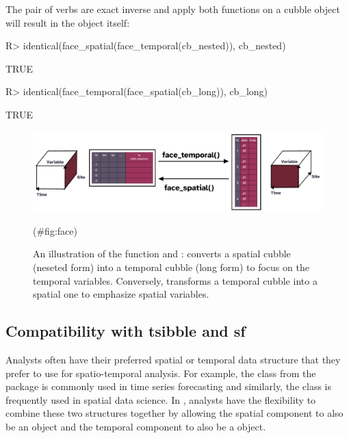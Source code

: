 \documentclass[
]{jss}
\begin{document}
The pair of verbs are exact inverse and apply both functions on a cubble
object will result in the object itself:

\begin{CodeChunk}
\begin{CodeInput}
R> identical(face_spatial(face_temporal(cb_nested)), cb_nested)
\end{CodeInput}
\begin{CodeOutput}
[1] TRUE
\end{CodeOutput}
\begin{CodeInput}
R> identical(face_temporal(face_spatial(cb_long)), cb_long)
\end{CodeInput}
\begin{CodeOutput}
[1] TRUE
\end{CodeOutput}
\end{CodeChunk}

\begin{CodeChunk}
\begin{figure}

{\centering \includegraphics[width=1\linewidth]{figures/diagram-keynotes/diagram-keynotes.001} 

}

\caption{An illustration of the function  and :  converts a spatial cubble (neseted form) into a temporal cubble (long form) to focus on the temporal variables. Conversely,  transforms a temporal cubble into a spatial one to emphasize spatial variables.}(\#fig:face)
\end{figure}
\end{CodeChunk}

\hypertarget{compatibility-with-tsibble-and-sf}{%
\subsection{Compatibility with tsibble and
sf}\label{compatibility-with-tsibble-and-sf}}

Analysts often have their preferred spatial or temporal data structure
that they prefer to use for spatio-temporal analysis. For example, the
 class from the  package \citep{tsibble} is
commonly used in time series forecasting and similarly, the 
class \citep{sf} is frequently used in spatial data science. In
, analysts have the flexibility to combine these two
structures together by allowing the spatial component to also be an
 object and the temporal component to also be a 
object.
\end{document}
